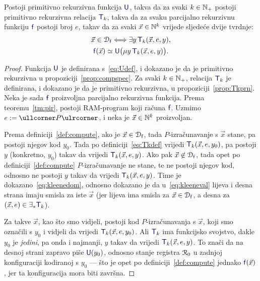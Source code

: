 \begin{teorem}\label{tm:Kleene}
Postoji primitivno rekurzivna funkcija $\f U$, takva da za svaki $k\in{\mathbb N}_+$ postoji primitivno rekurzivna relacija $\f T_k$, takva da za svaku parcijalno rekurzivnu funkciju $\f f$ postoji broj $e$, takav da za svaki $\vec x\in{\mathbb N}^k$ vrijede sljedeće dvije tvrdnje:
\begin{gather}
    \label{eq:kleenedom}\vec x\in\dom{\f f}\Longleftrightarrow\exists y\,\f T_k(\vec x,e,y)\text,\\
    \label{eq:kleeneval}\f f(\vec x)\simeq\f U\bigl(\mu y\,\f T_k(\vec x,e,y)\bigr)\text.
\end{gather}
\end{teorem}
\begin{proof}
Funkcija $\f U$ je definirana s~\eqref{eq:Udef}, i dokazano je da je primitivno rekurzivna u propoziciji~\ref{prop:compspec}. Za svaki $k\in{\mathbb N}_+$, relacija $\f T_k$ je definirana, i dokazano je da je primitivno rekurzivna, u propoziciji~\ref{prop:Tkprn}. Neka je sada $\f f$ proizvoljna parcijalno rekurzivna funkcija. Prema teoremu~\ref{tm:pir}, postoji RAM-program koji računa $\f f$. Uzmimo $e:=\kprog P$, i neka je $\vec x\in{\mathbb N}^k$ proizvoljan.

Prema definiciji~\ref{def:compute}, ako je $\vec x\in\dom{\f f}$, tada $P$-izračunavanje s $\vec x$ stane, pa postoji njegov kod $y_0$. Tada po definiciji~\eqref{eq:Tkdef} vrijedi $\f T_k(\vec x,e,y_0)$, pa postoji $y$ (konkretno, $y_0$) takav da vrijedi $\f T_k(\vec x,e,y)$. Ako pak $\vec x\not\in\dom{\f f}$, tada opet po definiciji~\ref{def:compute} $P$-izračunavanje ne stane, te ne postoji njegov kod, odnosno ne postoji $y$ takav da vrijedi $\f T_k(\vec x,e,y)$. Time je dokazano~\eqref{eq:kleenedom}, odnosno dokazano je da u~\eqref{eq:kleeneval} lijeva i desna strana imaju smisla za iste $\vec x$ (jer lijeva ima smisla za $\vec x\in\dom{\f f}$, a desna za $(\vec x,e)\in\exists_*\f T_k$).

Za takve $\vec x$, kao što smo vidjeli, postoji kod $P$-izračunavanja s $\vec x$, koji smo označili s $y_0$ i vidjeli da vrijedi $\f T_k(\vec x,e,y_0)$. Ali $\f T_k$ ima funkcijsko svojstvo, dakle $y_0$ je \emph{jedini}, pa onda i najmanji, $y$ takav da vrijedi $\f T_k(\vec x,e,y)$. To znači da na desnoj strani zapravo piše $\f U(y_0)$, odnosno stanje registra $\mathcal R_{0}$ u zadnjoj konfiguraciji kodiranoj s $y_0$ --- što je opet po definiciji~\ref{def:compute} jednako $\f f(\vec x)$, jer ta konfiguracija mora biti završna.
\end{proof}

